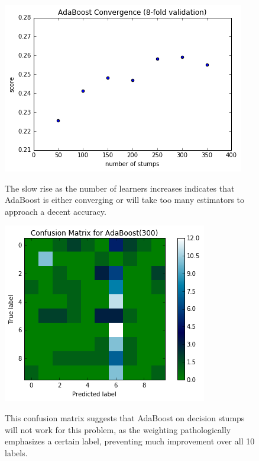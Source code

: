 \documentclass[9pt]{article}
\begin{document}
\begin{figure}[H]
    \centering
    
    \begin{minipage}[b]{0.4\textwidth}
        \includegraphics[scale=0.5]{ada-convergence.png}
        \label{fig:ada-convergence}
        \caption{The slow rise as the number of learners increases indicates that AdaBoost is either converging or will take too many estimators to approach a decent accuracy.}
    \end{minipage}
    \hfill
    \begin{minipage}[b]{0.4\textwidth}
        \includegraphics[scale=0.5]{ada-confusion.png}
        \label{fig:ada-confusion}
        \caption{This confusion matrix suggests that AdaBoost on decision stumps will not
        work for this problem, as the weighting pathologically emphasizes a certain label, preventing much improvement over all 10 labels.}
    \end{minipage}
    
    \label{fig:fv33}
\end{figure}
\end{document}
